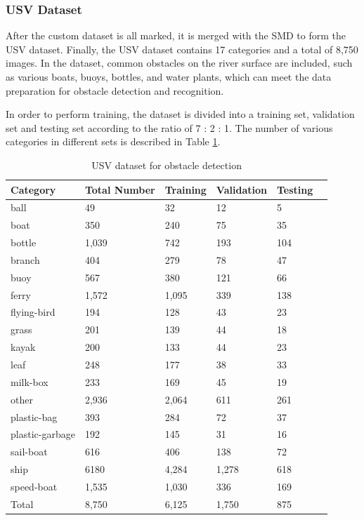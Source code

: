 \documentclass[sensors,article,submit,moreauthors,pdftex]{Definitions/mdpi}
\begin{document}
\begin{paracol}{2}
\subsubsection{USV Dataset}
After the custom dataset is all marked, it is merged with the SMD to form the USV dataset. Finally, the USV dataset contains 17 categories and a total of 8,750 images. In the dataset, common obstacles on the river surface are included, such as various boats, buoys, bottles, and water plants, which can meet the data preparation for obstacle detection and recognition.

In order to perform training, the dataset is divided into a training set, validation set and testing set according to the ratio of 7 : 2 : 1. The number of various categories in different sets is described in Table \ref{tbl:USV dataset for obstacle detection}.

\begin{table}[htbp]
\centering
\caption{USV dataset for obstacle detection}
\begin{tabular}{llllll} 
\toprule
\textbf{Category}&\textbf{Total Number}&\textbf{Training}&\textbf{Validation}&\textbf{Testing}\\
\midrule
ball& 49& 32& 12& 5 \\
boat& 350& 240& 75& 35 \\
bottle& 1,039& 742& 193& 104 \\
branch& 404& 279& 78& 47 \\
buoy& 567& 380& 121& 66 \\
ferry& 1,572& 1,095& 339& 138 \\
flying-bird& 194& 128& 43& 23 \\
grass& 201& 139& 44& 18 \\
kayak& 200& 133& 44& 23 \\
leaf& 248& 177& 38& 33 \\
milk-box& 233& 169& 45& 19 \\
other& 2,936& 2,064& 611& 261 \\
plastic-bag& 393& 284& 72& 37 \\
plastic-garbage& 192& 145& 31& 16 \\
sail-boat& 616& 406& 138& 72 \\
ship& 6180& 4,284& 1,278& 618 \\
speed-boat& 1,535& 1,030& 336& 169 \\
\cmidrule(r){1-5}
Total& 8,750& 6,125& 1,750& 875 \\
\bottomrule
\end{tabular}
\label{tbl:USV dataset for obstacle detection}
\end{table}




\end{paracol}
\end{document}
